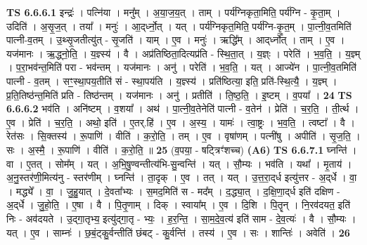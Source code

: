 \documentclass[17pt]{extarticle}
\begin{document}
                                \textbf{ TS 6.6.6.1} \newline
                  इन्द्रः॑ । पत्नि॑या । मनु᳚म् । अ॒या॒ज॒य॒त् । ताम् । पर्य॑ग्निकृता॒मिति॒ पर्य॑ग्नि - कृ॒ता॒म् । उदिति॑ । अ॒सृ॒ज॒त् । तया᳚ । मनुः॑ । आ॒द्‌र्ध्नो॒त् । यत् । पर्य॑ग्निकृत॒मिति॒ पर्य॑ग्नि-कृ॒त॒म् । पा॒त्नी॒व॒तमिति॑ पात्नी-व॒तम् । उ॒थ्सृ॒जतीत्यु॑त् - सृ॒जति॑ । याम् । ए॒व । मनुः॑ । ऋद्धि᳚म् । आद्‌र्ध्नो᳚त् । ताम् । ए॒व । यज॑मानः । ऋ॒द्ध्नो॒ति॒ । य॒ज्ञ्स्य॑ । वै । अप्र॑तिष्ठिता॒दित्यप्र॑ति - स्थि॒ता॒त् । य॒ज्ञ्ः । परेति॑ । भ॒व॒ति॒ । य॒ज्ञ्म् । प॒रा॒भव॑न्त॒मिति॑ परा - भव॑न्तम् । यज॑मानः । अनु॑ । परेति॑ । भ॒व॒ति॒ । यत् । आज्ये॑न । पा॒त्नी॒व॒तमिति॑ पात्नी - व॒तम् । सꣳ॒॒स्था॒पय॒तीति॑ सं - स्था॒पय॑ति । य॒ज्ञ्स्य॑ । प्रति॑ष्ठित्या॒ इति॒ प्रति॑-स्थि॒त्यै॒ । य॒ज्ञ्म् । प्र॒ति॒तिष्ठ॑न्त॒मिति॑ प्रति - तिष्ठ॑न्तम् । यज॑मानः । अनु॑ । प्रतीति॑ । ति॒ष्ठ॒ति॒ । इ॒ष्टम् । व॒पया᳚ । \textbf{  24} \newline
                  \newline
                                \textbf{ TS 6.6.6.2} \newline
                  भव॑ति । अनि॑ष्टम् । व॒शया᳚ । अथ॑ । पा॒त्नी॒व॒तेनेति॑ पात्नी - व॒तेन॑ । प्रेति॑ । च॒र॒ति॒ । ती॒र्त्थ । ए॒व । प्रेति॑ । च॒र॒ति॒ । अथो॒ इति॑ । ए॒तर्.हि॑ । ए॒व । अ॒स्य॒ । यामः॑ । त्वा॒ष्ट्रः । भ॒व॒ति॒ । त्वष्टा᳚ । वै । रेत॑सः । सि॒क्तस्य॑ । रू॒पाणि॑ । वीति॑ । क॒रो॒ति॒ । तम् । ए॒व । वृषा॑णम् । पत्नी॑षु । अपीति॑ । सृ॒ज॒ति॒ । सः । अ॒स्मै॒ । रू॒पाणि॑ । वीति॑ । क॒रो॒ति॒ ॥ \textbf{  25 } \newline
                  \newline
                      (व॒पया॒ - षट्त्रिꣳ॑शच्च)  \textbf{(A6)} \newline \newline
                                \textbf{ TS 6.6.7.1} \newline
                  घ्नन्ति॑ । वा । ए॒तत् । सोम᳚म् । यत् । अ॒भि॒षु॒ण्वन्तीत्य॑भि-सु॒न्वन्ति॑ । यत् । सौ॒म्यः । भव॑ति । यथा᳚ । मृ॒ताय॑ । अ॒नु॒स्तर॑णी॒मित्य॑नु - स्तर॑णीम् । घ्नन्ति॑ । ता॒दृक् । ए॒व । तत् । यत् । उ॒त्त॒रा॒द्‌र्ध इत्यु॑त्तर - अ॒द्‌र्धे । वा॒ । मद्ध्ये᳚ । वा॒ । जु॒हु॒यात् । दे॒वता᳚भ्यः । स॒मद॒मिति॑ स - मद᳚म् । द॒द्ध्या॒त् । द॒क्षि॒णा॒द्‌र्ध इति॑ दक्षिण - अ॒द्‌र्धे । जु॒हो॒ति॒ । ए॒षा । वै । पि॒तृ॒णाम् । दिक् । स्वाया᳚म् । ए॒व । दि॒शि । पि॒तॄन् । नि॒रव॑दयत॒ इति॑ निः - अव॑दयते । उ॒द्गा॒तृभ्य॒ इत्यु॑द्गा॒तृ - भ्यः॒ । ह॒र॒न्ति॒ । सा॒म॒दे॒व॒त्य॑ इति॑ साम - दे॒व॒त्यः॑ । वै । सौ॒म्यः । यत् । ए॒व । साम्नः॑ । छ॒बं॒ट्कु॒र्वन्तीति॑ छंबट् - कु॒र्वन्ति॑ । तस्य॑ । ए॒व । सः । शान्तिः॑ । अवेति॑ । \textbf{  26} \newline
\end{document}

